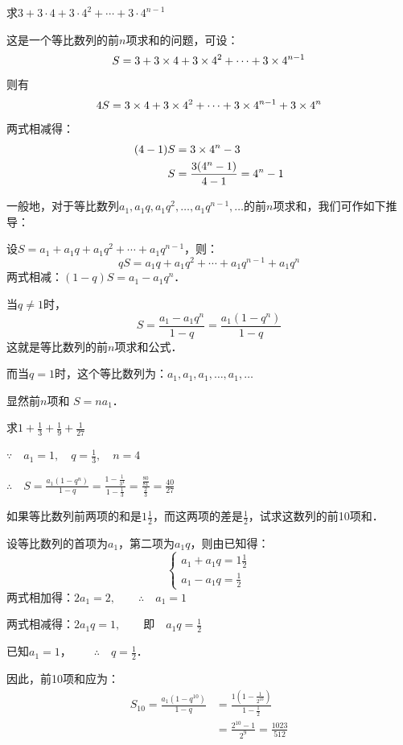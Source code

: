\begin{example}
求$3+3\cdot 4+3\cdot 4^2+\cdots+3\cdot 4^{n-1}$
\end{example}
    
\begin{solution}
这是一个等比数列的前$n$项求和的问题，可设：$$S=3+3\times4+3\times4^2+\cdots+3\times4^{n-1}$$
则有
\[4S=3\times4+3\times4^2+\cdots+3\times4^{n-1}+3\times4^n\]
两式相减得：
\[\begin{split}
    (4-1) S&=3\times4^n-3\\
    S&=\dfrac{3(4^n-1)}{4-1}=4^n-1
\end{split}\]
\end{solution}

一般地，对于等比数列$a_1,a_1q,a_1q^2,\ldots,a_1q^{n-1},\ldots$的前$n$项求和，我们可作如下推导：

设$S=a_1+a_1q+a_1q^2+\cdots+a_1q^{n-1}$，则：
\[qS=a_1q+a_1q^2+\cdots+a_1q^{n-1}+a_1q^n\]
两式相减：$(1-q)S=a_1-a_1q^n$．

当$q\ne 1$时，
\[S=\frac{a_1-a_1q^n}{1-q}=\frac{a_1(1-q^n)}{1-q}\]
这就是等比数列的前$n$项求和公式．

而当$q=1$时，这个等比数列为：$a_1,a_1,a_1,\ldots,a_1,\ldots$

显然前$n$项和 $S=na_1$．

\begin{example}
    求$1+\frac{1}{3}+\frac{1}{9}+\frac{1}{27}$
\end{example}

\begin{solution}
    $\because\quad a_1=1,\quad q=\frac{1}{3},\quad n=4$

    $\therefore\quad S=\frac{a_1(1-q^n)}{1-q}=\frac{1-\frac{1}{3^4}}{1-\frac{1}{3}}=\frac{\frac{80}{81}}{\frac{2}{3}}=\frac{40}{27}$
\end{solution}

\begin{example}
    如果等比数列前两项的和是$1\frac{1}{2}$，而这两项的差是$\frac{1}{2}$，试求这数列的前10项和．    
\end{example}


\begin{solution}
    设等比数列的首项为$a_1$，第二项为$a_1q$，则由已知得：
    \[\begin{cases}
    a_1+a_1q=1\frac{1}{2}\\
    a_1-a_1q=\frac{1}{2}    
    \end{cases}\]
    两式相加得：$2a_1=2,\qquad \therefore\quad a_1=1$

    两式相减得：$2a_1q=1,\qquad $即$\quad a_1q=\frac{1}{2}$

    已知$a_1=1$，$\qquad \therefore\quad q=\frac{1}{2}$．

    因此，前10项和应为：
\[\begin{split}
    S_{10}=\frac{a_1(1-q^{10})}{1-q}&=\frac{1\left(1-\frac{1}{2^{10}}\right)}{1-\frac{1}{2}}\\
    &=\frac{2^{10}-1}{2^9}=\frac{1023}{512}
\end{split}\]
\end{solution}



